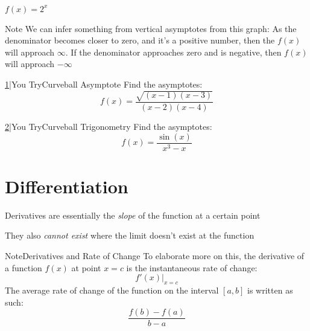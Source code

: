 \documentclass{MathNotes}
\newenvironment{note}[1]{\begin{YellowBox}{Note}{#1}}{\end{YellowBox}}
\newenvironment{practice}[2]{\begin{PurpleBox}{\texorpdfstring{#1}\Big|You Try}{#2}}{\end{PurpleBox}}
\begin{document}
\begin{multicols}{2}
{\begin{center}
			$f(x)=2^x$
		\end{center}
	}
\end{multicols}

\begin{note}{}
	We can infer something from vertical asymptotes from this graph:
	As the denominator becomes closer to zero, and it's a positive number, then
	the $f(x)$ will approach $\infty$. If the denominator approaches zero and
	is negative, then $f(x)$ will approach $-\infty$
\end{note}

\begin{multicols}{2}
	\begin{practice}{\hyperref[ans:1.3.3-1]{1}}{Curveball Asymptote}\label{prac:1.3.3-1}
		Find the asymptotes:
		\begin{displaymath}
			f(x)=\frac{\sqrt{(x-1)(x-3)}}{(x-2)(x-4)}
		\end{displaymath}
	\end{practice}

	\begin{practice}{\hyperref[ans:1.3.3-2]{2}}{Curveball Trigonometry}\label{prac:1.3.3-2}
		Find the asymptotes:
		\begin{displaymath}
			f(x)=\frac{\sin(x)}{x^3-x}
		\end{displaymath}
	\end{practice}
\end{multicols}

\newpage
\section{Differentiation}
Derivatives are essentially the \textit{slope} of the function at a
certain point

They also \textit{cannot exist} where the limit doesn't exist at the
function

\begin{note}{Derivatives and Rate of Change}
	To elaborate more on this, the derivative of a function $f(x)$ at point $x=c$
	is the instantaneous rate of change: $$f'(x)\Big|_{x=c}$$ The average rate of
	change of the function on the interval $[a, b]$ is written as such:
	$$\frac{f(b)-f(a)}{b-a}$$
\end{note}
\end{document}
